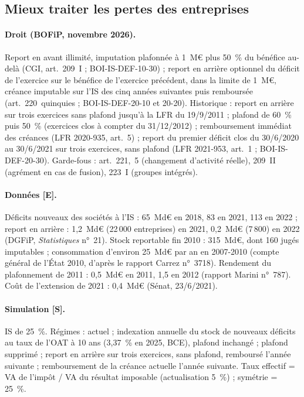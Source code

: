 \subsection{Mieux traiter les pertes des entreprises}\label{ann:pal-pertes}

\paragraph{Droit (BOFiP, novembre 2026).} Report en avant illimité, imputation plafonnée à 1~M€ plus 50~\% du bénéfice
au-delà (CGI, art.~209~I ; BOI-IS-DEF-10-30) ; report en arrière optionnel du déficit de l'exercice sur le bénéfice de
l'exercice précédent, dans la limite de 1~M€, créance imputable sur l'IS des cinq années suivantes puis remboursée
(art.~220~quinquies ; BOI-IS-DEF-20-10 et 20-20). Historique : report en arrière sur trois exercices sans plafond jusqu'à
la LFR du 19/9/2011 ; plafond de 60~\% puis 50~\% (exercices clos à compter du 31/12/2012) ; remboursement immédiat des
créances (LFR 2020-935, art.~5) ; report du premier déficit clos du 30/6/2020 au 30/6/2021 sur trois exercices, sans
plafond (LFR 2021-953, art.~1 ; BOI-IS-DEF-20-30). Garde-fous : art.~221,~5 (changement d'activité réelle), 209~II
(agrément en cas de fusion), 223~I (groupes intégrés).

\paragraph{Données [E].} Déficits nouveaux des sociétés à l'IS : 65~Md€ en 2018, 83 en 2021, 113 en 2022 ; report en
arrière : 1,2~Md€ (22\,000 entreprises) en 2021, 0,2~Md€ (7\,800) en 2022 (DGFiP, \emph{Statistiques} n°~21). Stock
reportable fin 2010 : 315~Md€, dont 160 jugés imputables ; consommation d'environ 25~Md€ par an en 2007-2010 (compte
général de l'État 2010, d'après le rapport Carrez n°~3718). Rendement du plafonnement de 2011 : 0,5~Md€ en 2011, 1,5 en
2012 (rapport Marini n°~787). Coût de l'extension de 2021 : 0,4~Md€ (Sénat, 23/6/2021).

\paragraph{Simulation [S].} IS de 25~\%. Régimes : actuel ; indexation annuelle du stock de nouveaux déficits au taux
de l'OAT à 10 ans (3,37~\% en 2025, BCE), plafond inchangé ; plafond supprimé ; report en arrière sur trois exercices,
sans plafond, remboursé l'année suivante ; remboursement de la créance actuelle l'année suivante. Taux effectif = VA de
l'impôt / VA du résultat imposable (actualisation 5~\%) ; symétrie = 25~\%.

